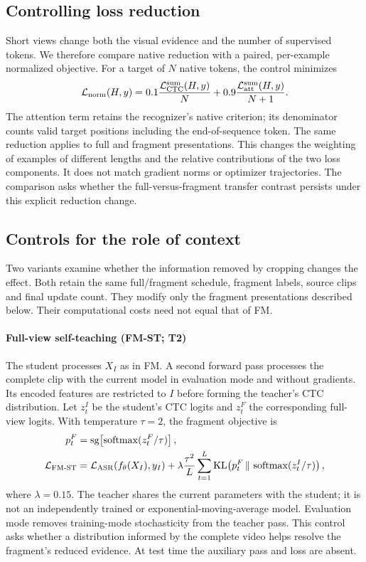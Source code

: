 \subsection{Controlling loss reduction}
Short views change both the visual evidence and the number of supervised tokens.
We therefore compare native reduction with a paired, per-example normalized
objective. For a target of $N$ native tokens, the control minimizes
\begin{equation}
 \mathcal L_{\rm norm}(H,y)
 =0.1\frac{\mathcal L_{\mathrm{CTC}}^{\rm sum}(H,y)}{N}
 +0.9\frac{\mathcal L_{\mathrm{att}}^{\rm sum}(H,y)}{N+1}.
 \label{eq:normalized}
\end{equation}
The attention term retains the recognizer's native criterion; its denominator
counts valid target positions including the end-of-sequence token. The same
reduction applies to full and fragment presentations. This changes the weighting
of examples of different lengths and the relative contributions of the two
loss components. It does not match gradient norms or optimizer trajectories.
The comparison asks whether the full-versus-fragment transfer contrast persists
under this explicit reduction change.

\subsection{Controls for the role of context}
Two variants examine whether the information removed by cropping changes the
effect. Both retain the same full/fragment schedule, fragment labels, source clips
and final update count. They modify only the fragment presentations described
below. Their computational costs need not equal that of FM.

\paragraph{Full-view self-teaching (FM-ST; T2)}
The student processes $X_I$ as in FM. A second forward pass processes the complete
clip with the current model in evaluation mode and without gradients. Its encoded
features are restricted to $I$ before forming the teacher's CTC distribution.
Let $z_t^I$ be the student's CTC logits and $z_t^F$ the corresponding full-view
logits. With temperature $\tau=2$, the fragment objective is
\begin{align}
 p_t^F &= \operatorname{sg}\!\left[\operatorname{softmax}(z_t^F/\tau)\right],\\
 \mathcal L_{\rm FM\text{-}ST}
 &= \mathcal L_{\rm ASR}(f_\theta(X_I),y_I)
 + \lambda\frac{\tau^2}{L}
   \sum_{t=1}^{L}\operatorname{KL}\!\left(p_t^F\,\Vert\,
             \operatorname{softmax}(z_t^I/\tau)\right),
 \label{eq:teacher}
\end{align}
where $\lambda=0.15$. The teacher shares the current parameters with the student;
it is not an independently trained or exponential-moving-average model. Evaluation
mode removes training-mode stochasticity from the teacher pass. This control asks
whether a distribution informed by the complete video helps resolve the fragment's
reduced evidence. At test time the auxiliary pass and loss are absent.

